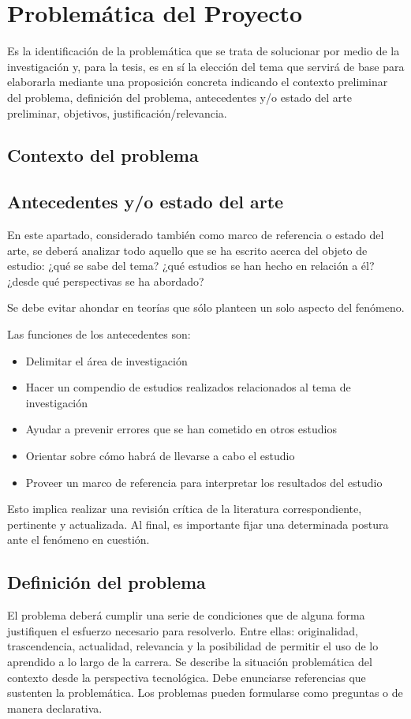 \chapter{Problemática del Proyecto}

Es la identificación de la problemática que se trata de solucionar por medio de la investigación y, para la tesis, es en sí la elección del tema que servirá de base para elaborarla mediante una proposición concreta indicando el contexto preliminar del problema, definición del problema, antecedentes y/o estado del arte preliminar, objetivos, justificación/relevancia.

\section{Contexto del problema}

\section{Antecedentes y/o estado del arte}

En este apartado, considerado también como marco de referencia o estado del arte, se deberá analizar todo aquello que se ha escrito acerca del objeto de estudio: ¿qué se sabe del tema? ¿qué estudios se han hecho en relación a él? ¿desde qué perspectivas se ha abordado?\newline

Se debe evitar ahondar en teorías que sólo planteen un solo aspecto del fenómeno.\newline

Las funciones de los antecedentes son:

\begin{itemize}
    \item Delimitar el área de investigación
    \item Hacer un compendio de estudios realizados relacionados al tema de investigación
    \item Ayudar a prevenir errores que se han cometido en otros estudios
    \item Orientar sobre cómo habrá de llevarse a cabo el estudio
    \item Proveer un marco de referencia para interpretar los resultados del estudio
\end{itemize}

Esto implica realizar una revisión crítica de la literatura correspondiente, pertinente y actualizada. Al final, es importante fijar una determinada postura ante el fenómeno en cuestión.

\section{Definición del problema}

El problema deberá cumplir una serie de condiciones que de alguna forma justifiquen el esfuerzo necesario para resolverlo. Entre ellas: originalidad, trascendencia, actualidad, relevancia y la posibilidad de permitir el uso de lo aprendido a lo largo de la carrera. Se describe la situación problemática del contexto desde la perspectiva tecnológica. Debe enunciarse referencias que sustenten la problemática. Los problemas pueden formularse como preguntas o de manera declarativa.